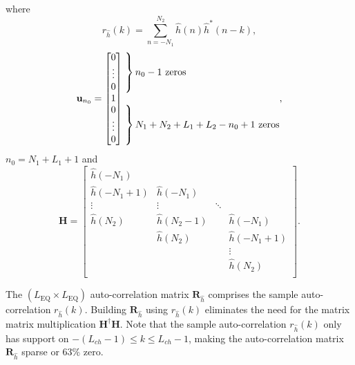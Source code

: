 where
\begin{equation}
r_{\hat{h}}(k) = \sum_{n=-N_1}^{N_2} \hat{h}(n) \hat{h}^\ast(n-k),
\label{eq:sample_autocorrelation_ZF}
\end{equation}
\begin{equation}
\mathbf{u}_{n_0} = \begin{bmatrix} 0 \\ \vdots \\ 0 \\ 1 \\ 0 \\ \vdots \\ 0 \end{bmatrix}
	\begin{matrix*}[l] \left. \vphantom{\begin{matrix} 0 \\ \vdots \\ 0 \end{matrix}} \right\}
		\text{$n_0-1$ zeros}
		\\ \\
		\left. \vphantom{\begin{matrix} 0 \\ \vdots \\ 0 \end{matrix}} \right\}
		\text{$N_1+N_2+L_1+L_2-n_0+1$ zeros}
		\end{matrix*},
		\label{eq:un0_ZF}
\end{equation}
$n_0 = N_1+L_1+1$ and
\begin{equation} 
\mathbf{H} = 
		\begin{bmatrix}
		\hat{h}(-N_1)		&  				& 		 	&  					\\
		\hat{h}(-N_1+1) 	& \hat{h}(-N_1)	& 		 	&  					\\
		\vdots	 			& \vdots		& \ddots 	&  					\\
		\hat{h}(N_2)		& \hat{h}(N_2-1)&  			& \hat{h}(-N_1)  	\\
		 					& \hat{h}(N_2) 	&  			& \hat{h}(-N_1+1) 	\\
		 					&  	   			&  			& \vdots			\\
		 					&  	   			&  			& \hat{h}(N_2)		\\
	\end{bmatrix}.
\end{equation}

The $(L_\text{EQ} \times L_\text{EQ})$ auto-correlation matrix $\mathbf{R}_{\hat{h}}$ comprises the sample auto-correlation $r_{\hat{h}}(k)$.
Building $\mathbf{R}_{\hat{h}}$ using $r_{\hat{h}}(k)$ eliminates the need for the matrix matrix multiplication $\mathbf{H}^\dagger \mathbf{H}$.
Note that the sample auto-correlation $r_{\hat{h}}(k)$ only has support on $-(L_{ch}-1) \leq k \leq L_{ch}-1$, making the auto-correlation matrix $\mathbf{R}_{\hat{h}}$ sparse or $63\%$ zero.

